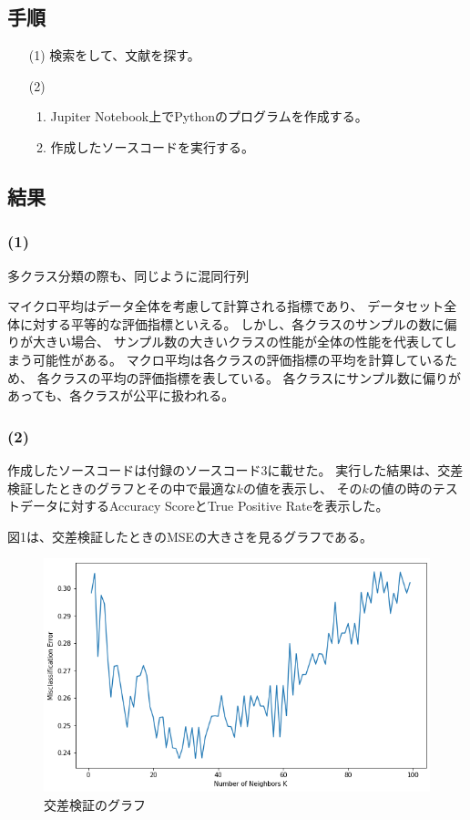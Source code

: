 \documentclass[12pt]{jarticle}
\begin{document}
\subsection{手順}
\begin{itemize}
    \item [(1)]検索をして、文献を探す。
    \item [(2)]\begin{enumerate}
              \item Jupiter Notebook上でPythonのプログラムを作成する。
              \item 作成したソースコードを実行する。
          \end{enumerate}
\end{itemize}

\subsection{結果}
\subsubsection*{(1)}
多クラス分類の際も、同じように混同行列

マイクロ平均はデータ全体を考慮して計算される指標であり、
データセット全体に対する平等的な評価指標といえる。
しかし、各クラスのサンプルの数に偏りが大きい場合、
サンプル数の大きいクラスの性能が全体の性能を代表してしまう可能性がある。
マクロ平均は各クラスの評価指標の平均を計算しているため、
各クラスの平均の評価指標を表している。
各クラスにサンプル数に偏りがあっても、各クラスが公平に扱われる。
\clearpage
\subsubsection*{(2)}
作成したソースコードは付録のソースコード3に載せた。
実行した結果は、交差検証したときのグラフとその中で最適な$k$の値を表示し、
その$k$の値の時のテストデータに対するAccuracy ScoreとTrue Positive Rateを表示した。

図1は、交差検証したときのMSEの大きさを見るグラフである。
\begin{figure}[h]
    \begin{center}
        \includegraphics[scale=0.6]{kadai2_2_1.png}
    \end{center}
    \caption{交差検証のグラフ}
\end{figure}
\end{document}
